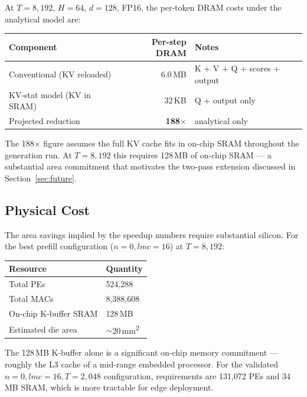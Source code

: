 \documentclass[11pt]{article}
\begin{document}
At \(T = 8{,}192\), \(H = 64\), \(d = 128\), FP16, the
per-token DRAM costs under the analytical model are:

\begin{center}
\begin{tabular}{lrl}
\toprule
Component & Per-step DRAM & Notes \\
\midrule
Conventional (KV reloaded) & 6.0\,MB & K + V + Q + scores + output \\
KV-stat model (KV in SRAM) & 32\,KB  & Q + output only \\
\midrule
Projected reduction & \textbf{188$\times$} & analytical only \\
\bottomrule
\end{tabular}
\end{center}

The 188$\times$ figure assumes the full KV cache fits in on-chip
SRAM throughout the generation run.
At \(T = 8{,}192\) this requires 128\,MB of on-chip SRAM ---
a substantial area commitment that motivates the two-pass
extension discussed in Section~\ref{sec:future}.

\subsection{Physical Cost}

The area savings implied by the speedup numbers require
substantial silicon.
For the best prefill configuration (\(n = 0, lmc = 16\)) at
\(T = 8{,}192\):

\begin{center}
\begin{tabular}{ll}
\toprule
Resource & Quantity \\
\midrule
Total PEs & 524{,}288 \\
Total MACs & 8{,}388{,}608 \\
On-chip K-buffer SRAM & 128\,MB \\
Estimated die area & \(\sim\)20\,mm\textsuperscript{2} \\
\bottomrule
\end{tabular}
\end{center}

The 128\,MB K-buffer alone is a significant on-chip memory
commitment --- roughly the L3 cache of a mid-range embedded
processor.
For the validated \(n = 0, lmc = 16, T = 2{,}048\) configuration,
requirements are 131{,}072 PEs and 34\,MB SRAM, which is
more tractable for edge deployment.

\end{document}
